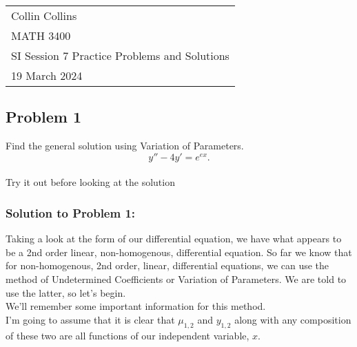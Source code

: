 \documentclass[a4paper,12pt]{article}
\begin{document}

\thispagestyle{empty}

\begin{tabular}{p{15.5cm}}
\\ Collin Collins \\
MATH 3400\\
SI Session 7 Practice Problems and Solutions\\
19 March 2024 \\
\hline

\end{tabular} 

\subsection*{Problem 1} 
Find the general solution using Variation of Parameters.
$$ y''-4y' = e^{ex}. $$
\\
 
Try it out before looking at the solution
\pagebreak

\subsubsection*{Solution to Problem 1:}
Taking a look at the form of our differential equation, we have what appears to be a 2nd order linear, non-homogenous, differential equation. So far we know that for non-homogenous, 2nd order, linear, differential equations, we can use the method of Undetermined Coefficients or Variation of Parameters. We are told to use the latter, so let's begin.\\

We'll remember some important information for this method.\\

I'm going to assume that it is clear that $\mu_{1,2}$ and $y_{1,2}$ along with any composition of these two are all functions of our independent variable, $x$.\\
\end{document}
